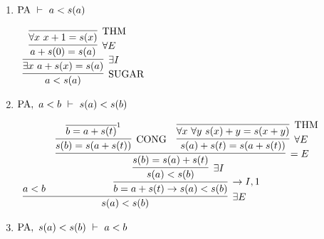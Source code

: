 \documentclass[11pt]{report}
\newcommand{\temp}[2]{{\overline{#2}}^{#1}}
\begin{document}
\begin{enumerate}
\begin{enumerate}
			$$0 < a := \ \exists x \ a = 0 + s(x)$$
			$$0 < s(a) := \ \exists x \ s(a) = 0 + s(x)$$
			
			As such, we must use an instance of $\exists$ elimination to make use of such an hypothesis.
			
			\begin{center}
				$\begin{array}{c}
					\infer[\exists E]{0 < s(a)}
						{0 < a
						&
						\infer[\to I,1]{a = 0 + s(a) \to 0 < s(a)}{
							\infer[\exists I]{0 < s(a)}
								{\infer[=E]{s(a) = 0 + s(s(t))}
									{\infer[\forall E]{s(s(t)) = 0 + s(s(t))}
										{\infer[\THM]{\forall x \ x = 0 + x}{}}
									&
									\infer[=E]{s(a) = s(s(t))}
										{\infer[\text{CONG}]{s(a) = s(0 + s(t))}
											{\temp{1}{a = 0 + s(a)}}
										&
										\infer[\forall E]{s(t) = 0 + s(t)}
											{\infer[\THM]{\forall x \ x = 0 + x}{}}}}}}}
				\end{array}$			
			\end{center}
			
			

			\item $\text{PA} \ \vdash \ a < s(a)$
			
			\begin{center}
			$\begin{array}{c}
				\infer[\text{SUGAR}]{a < s(a)}
					{\infer[\exists I]{\exists x \ a + s(x) = s(a)}
						{\infer[\forall E]{a + s(0) = s(a)}
							{\infer[\THM]{\forall x \ x + 1 = s(x)}
								{}}}}
			\end{array}$			
			\end{center}
			
			
			\item $\text{PA} , \ a < b \ \vdash \ s(a) < s(b)$
			
			\begin{center}
				$\begin{array}{c}
					\infer[\exists E]{s(a) < s(b)}
						{a < b
						&
						\infer[\to I,1]{b = a + s(t) \to s(a) < s(b)}
						{\infer[\exists I]{s(a) < s(b)}
							{\infer[=E]{s(b) = s(a) + s(t)}
								{\infer[\text{CONG}]{s(b) = s(a + s(t))}
									{\temp{1}{b = a + s(t)}}
								&
								\infer[\forall E]{s(a) + s(t) = s(a + s(t))}
									{\infer[\THM]{\forall x \ \forall y \ s(x) + y = s(x + y)}
										{}}}}}}				
				\end{array}$
			\end{center}
			
			\item $\text{PA} , \ s(a) < s(b) \ \vdash \ a < b$
			

\end{enumerate}
\end{enumerate}
\end{document}
